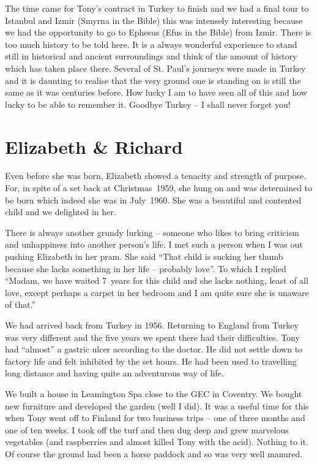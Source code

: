 The time came for Tony's contract in Turkey to finish and we had a
final tour to Istanbul and Izmir (Smyrna in the Bible) this was
intensely interesting because we had the opportunity to go to Ephesus
(Efus in the Bible) from Izmir. There is too much history to be told
here. It is a always wonderful experience to stand still in historical
and ancient surroundings and think of the amount of history which has
taken place there. Several of St. Paul’s journeys were made in Turkey
and it is daunting to realise that the very ground one is standing on
is still the same as it was centuries before. How lucky I am to have
seen all of this and how lucky to be able to remember it. Goodbye
Turkey -- I shall never forget you!


\chapter{Elizabeth \& Richard}

Even before she was born, Elizabeth showed a tenacity and strength of
purpose. For, in spite of a set back at Christmas~1959, she hung on
and was determined to be born which indeed she was in July~1960. She
was a beautiful and contented child and we delighted in her.

There is always another grundy lurking -- someone who likes to bring
criticism and unhappiness into another person's life. I met such a
person when I was out pushing Elizabeth in her pram. She said ``That
child is sucking her thumb because she lacks something in her life --
probably love''. To which I replied ``Madam, we have waited 7~years
for this child and she lacks nothing, least of all love, except
perhaps a carpet in her bedroom and I am quite sure she is unaware of
that.''


We had arrived back from Turkey in 1956. Returning to England from
Turkey was very different and the five years we spent there had their
difficulties. Tony had ``almost'' a gastric ulcer according to the
doctor. He did not settle down to factory life and felt inhibited by
the set hours. He had been used to travelling long distance and having
quite an adventurous way of life.

We built a house in Leamington Spa close to the GEC in Coventry. We
bought new furniture and developed the garden (well I did). It was a
useful time for this when Tony went off to Finland for two business
trips -- one of three months and one of ten weeks. I took off the turf
and then dug deep and grew marvelous vegetables (and raspberries and
almost killed Tony with the acid). Nothing to it. Of course the ground
had been a horse paddock and so was very well manured.

